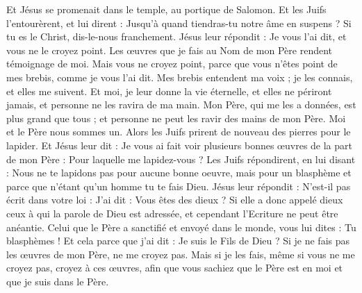 \begin{multicols}{2}
Et Jésus se promenait dans le temple, au portique de Salomon.
Et les Juifs l'entourèrent, et lui dirent : Jusqu'à quand tiendras-tu notre âme en suspens ? Si tu es le Christ, dis-le-nous franchement.
Jésus leur répondit : Je vous l'ai dit, et vous ne le croyez point. Les œuvres que je fais au Nom de mon Père rendent témoignage de moi.
Mais vous ne croyez point, parce que vous n'êtes point de mes brebis, comme je vous l'ai dit.
Mes brebis entendent ma voix ; je les connais, et elles me suivent.
Et moi, je leur donne la vie éternelle, et elles ne périront jamais, et personne ne les ravira de ma main.
Mon Père, qui me les a données, est plus grand que tous ; et personne ne peut les ravir des mains de mon Père.
Moi et le Père nous sommes un.
Alors les Juifs prirent de nouveau des pierres pour le lapider.
Et Jésus leur dit : Je vous ai fait voir plusieurs bonnes œuvres de la part de mon Père : Pour laquelle me lapidez-vous ?
Les Juifs répondirent, en lui disant : Nous ne te lapidons pas pour aucune bonne oeuvre, mais pour un blasphème et parce que n'étant qu'un homme tu te fais Dieu.
Jésus leur répondit : N'est-il pas écrit dans votre loi : J'ai dit : Vous êtes des dieux ?
Si elle a donc appelé dieux ceux à qui la parole de Dieu est adressée, et cependant l'Ecriture ne peut être anéantie.
Celui que le Père a sanctifié et envoyé dans le monde, vous lui dites : Tu blasphèmes ! Et cela parce que j'ai dit : Je suis le Fils de Dieu ?
Si je ne fais pas les œuvres de mon Père, ne me croyez pas.
Mais si je les fais, même si vous ne me croyez pas, croyez à ces œuvres, afin que vous sachiez que le Père est en moi et que je suis dans le Père.

\end{multicols}
